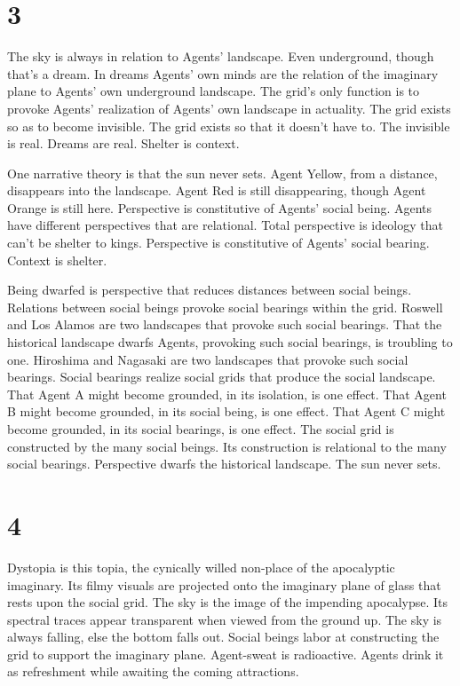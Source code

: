 \documentclass[
]{memoir}
\begin{document}
\hypertarget{section-4}{%
\section*{3}\label{section-4}}

The sky is always in relation to Agents' landscape. Even underground,
though that's a dream. In dreams Agents' own minds are the relation of
the imaginary plane to Agents' own underground landscape. The grid's
only function is to provoke Agents' realization of Agents' own landscape
in actuality. The grid exists so as to become invisible. The grid exists
so that it doesn't have to. The invisible is real. Dreams are real.
Shelter is context.

One narrative theory is that the sun never sets. Agent Yellow, from a
distance, disappears into the landscape. Agent Red is still
disappearing, though Agent Orange is still here. Perspective is
constitutive of Agents' social being. Agents have different perspectives
that are relational. Total perspective is ideology that can't be shelter
to kings. Perspective is constitutive of Agents' social bearing. Context
is shelter.

Being dwarfed is perspective that reduces distances between social
beings. Relations between social beings provoke social bearings within
the grid. Roswell and Los Alamos are two landscapes that provoke such
social bearings. That the historical landscape dwarfs Agents, provoking
such social bearings, is troubling to one. Hiroshima and Nagasaki are
two landscapes that provoke such social bearings. Social bearings
realize social grids that produce the social landscape. That Agent A
might become grounded, in its isolation, is one effect. That Agent B
might become grounded, in its social being, is one effect. That Agent C
might become grounded, in its social bearings, is one effect. The social
grid is constructed by the many social beings. Its construction is
relational to the many social bearings. Perspective dwarfs the
historical landscape. The sun never sets.

\hypertarget{section-5}{%
\section*{4}\label{section-5}}

Dystopia is this topia, the cynically willed non-place of the
apocalyptic imaginary. Its filmy visuals are projected onto the
imaginary plane of glass that rests upon the social grid. The sky is the
image of the impending apocalypse. Its spectral traces appear
transparent when viewed from the ground up. The sky is always falling,
else the bottom falls out. Social beings labor at constructing the grid
to support the imaginary plane. Agent-sweat is radioactive. Agents drink
it as refreshment while awaiting the coming attractions.
\end{document}
